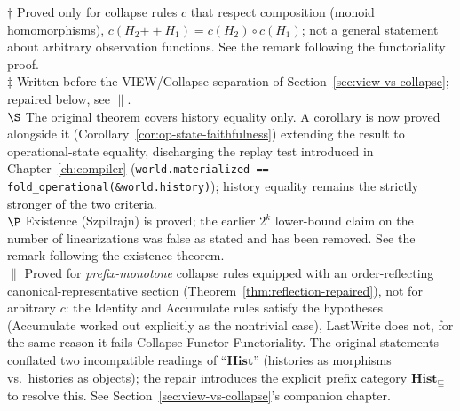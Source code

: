 \documentclass[12pt, a4paper, openany]{book}
\theoremstyle{plain}
\theoremstyle{definition}
\theoremstyle{remark}
\newcommand{\Hist}{\mathbf{Hist}}
\begin{document}
\smallskip
\noindent
$\dagger$ Proved only for collapse rules $c$ that respect composition
(monoid homomorphisms), $c(H_2 \mathbin{++} H_1) = c(H_2) \circ c(H_1)$; not a
general statement about arbitrary observation functions. See the remark
following the functoriality proof.\\
$\ddagger$ Written before the VIEW/Collapse separation of
Section~\ref{sec:view-vs-collapse}; repaired below, see $\|$.\\
$\S$ The original theorem covers history equality only. A corollary is now
proved alongside it (Corollary~\ref{cor:op-state-faithfulness}) extending the
result to operational-state equality, discharging the replay test introduced
in Chapter~\ref{ch:compiler}
(\texttt{world.materialized == fold\_operational(\&world.history)}); history
equality remains the strictly stronger of the two criteria.\\
$\P$ Existence (Szpilrajn) is proved; the earlier $2^k$ lower-bound claim on the
number of linearizations was false as stated and has been removed. See the
remark following the existence theorem.\\
$\|$ Proved for \emph{prefix-monotone} collapse rules equipped with an
order-reflecting canonical-representative section (Theorem~\ref{thm:reflection-repaired}),
not for arbitrary $c$: the Identity and Accumulate rules satisfy the hypotheses
(Accumulate worked out explicitly as the nontrivial case), LastWrite does not,
for the same reason it fails Collapse Functor Functoriality. The original
statements conflated two incompatible readings of ``$\Hist$'' (histories as
morphisms vs.\ histories as objects); the repair introduces the explicit prefix
category $\Hist_\sqsubseteq$ to resolve this. See
Section~\ref{sec:view-vs-collapse}'s companion chapter.
\end{document}
